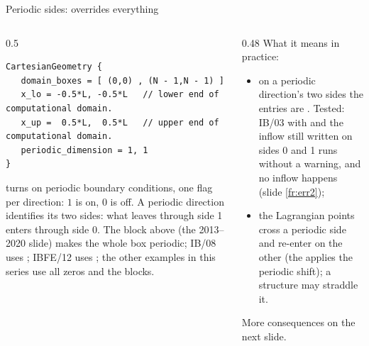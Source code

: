 \documentclass[aspectratio=169,11pt]{beamer}
\begin{document}
\begin{frame}[fragile]{Periodic sides:  overrides everything}
\label{fr:periodic}
\begin{columns}[T,onlytextwidth]
\begin{column}{0.5\textwidth}
\begin{lstlisting}[style=inputtiny]
CartesianGeometry {
   domain_boxes = [ (0,0) , (N - 1,N - 1) ]
   x_lo = -0.5*L, -0.5*L   // lower end of computational domain.
   x_up =  0.5*L,  0.5*L   // upper end of computational domain.
   periodic_dimension = 1, 1
}
\end{lstlisting}
\small {} turns on periodic boundary conditions, one flag per direction: $1$ is on, $0$ is off. A periodic direction identifies its two sides: what leaves through side 1 enters through side 0. The block above (the 2013--2020 slide) makes the whole box periodic; IB/08 uses ; IBFE/12 uses ; the other examples in this series use all zeros and the  blocks.
\end{column}
\begin{column}{0.48\textwidth}
\small What it means in practice:
\begin{itemize}
  \item on a periodic direction's two sides the  entries are . Tested: IB/03 with  and the inflow still written on sides 0 and 1 runs without a warning, and no inflow happens (slide \ref{fr:err2});
  \item the Lagrangian points cross a periodic side and re-enter on the other (the  applies the periodic shift); a structure may straddle it.
\end{itemize}
\small More consequences on the next slide.
\end{column}
\end{columns}
\end{frame}
\end{document}

